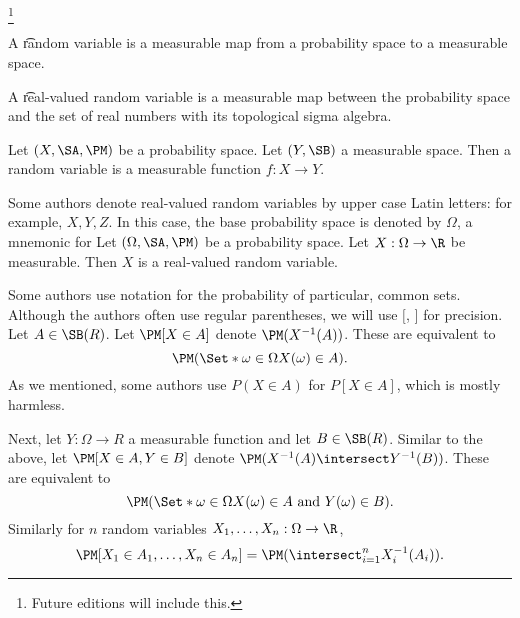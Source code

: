 

\footnote{Future editions will include this.}


A \t{random variable} is a measurable map from a probability space to a measurable space.

A \t{real-valued random variable} is a measurable map between the probability space and the set of real numbers with its topological sigma algebra.


Let $(X, \SA, \PM)$ be a probability space.
Let $(Y, \SB)$ a measurable space.
Then a random variable is a measurable function $f: X \to Y$.

Some authors denote real-valued random variables by upper case Latin letters:
for example, $X, Y, Z$.  In this case, the base probability space is denoted by $\Omega$, a mnemonic for 
Let $(\Omega,\SA,\PM)$ be a probability space.
Let $X: \Omega \to \R$ be measurable.
Then $X$ is a real-valued random variable.

Some authors use notation for the probability of particular, common sets.
Although the authors often use regular parentheses, we will use $[$, $]$ for precision.
Let $A \in \SB(R)$.
Let $\PM[X \in A]$ denote $\PM(X^{-1}(A))$.
These are equivalent to
\[
  \PM(\Set*{\omega \in \Omega}{X(\omega) \in A}).
\]
As we mentioned, some authors use $P(X \in A)$ for $P[X \in A]$, which is mostly harmless.

Next, let $Y: \Omega \to R$
a measurable function and
let $B \in \SB(R)$.
Similar to the above,
let $\PM[X \in A,Y \in B]$
denote $\PM(X^{-1}(A) \intersect Y^{-1}(B))$.
These are equivalent to
\[
  \PM(\Set*{\omega \in \Omega}{X(\omega) \in A \text{ and } Y(\omega) \in B}).
\]
Similarly for $n$ random variables $X_1, \dots, X_n: \Omega \to \R$,
\[
  \PM[X_1 \in A_1, \dots, X_n \in A_n] = \PM(\intersect_{i = 1}^{n} X_i^{-1}(A_i)).
\]
